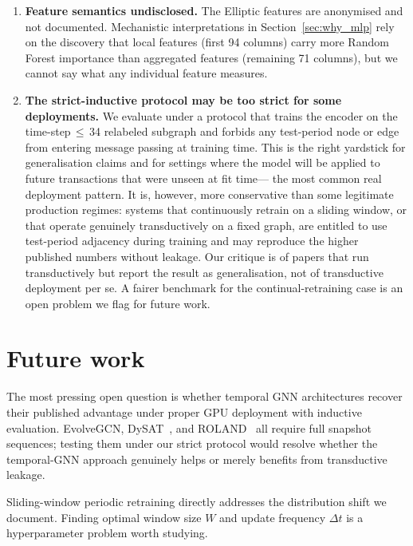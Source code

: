 \begin{enumerate}[leftmargin=*]
  \item \textbf{Feature semantics undisclosed.}  The Elliptic
    features are anonymised and not documented.  Mechanistic
    interpretations in Section~\ref{sec:why_mlp} rely on the
    discovery that local features (first 94 columns) carry more
    Random Forest importance than aggregated features (remaining
    71 columns), but we cannot say what any individual feature
    measures.

  \item \textbf{The strict-inductive protocol may be too strict for
    some deployments.}  We evaluate under a protocol that trains the
    encoder on the time-step\,$\le$\,34 relabeled subgraph and
    forbids any test-period node or edge from entering message
    passing at training time.  This is the right yardstick for
    generalisation claims and for settings where the model will be
    applied to future transactions that were unseen at fit time---
    the most common real deployment pattern.  It is, however, more
    conservative than some legitimate production regimes: systems
    that continuously retrain on a sliding window, or that operate
    genuinely transductively on a fixed graph, are entitled to use
    test-period adjacency during training and may reproduce the
    higher published numbers without leakage.  Our critique is of
    papers that run transductively but report the result as
    generalisation, not of transductive deployment per se.  A
    fairer benchmark for the continual-retraining case is an open
    problem we flag for future work.
\end{enumerate}


\section{Future work}
\label{sec:future}

The most pressing open question is whether temporal GNN architectures
recover their published advantage under proper GPU deployment with
inductive evaluation.  EvolveGCN, DySAT~\citep{sankar2020}, and
ROLAND~\citep{you2022roland} all require full snapshot sequences;
testing them under our strict protocol would resolve whether the
temporal-GNN approach genuinely helps or merely benefits from
transductive leakage.

Sliding-window periodic retraining directly addresses the distribution
shift we document.  Finding optimal window size $W$ and update
frequency $\Delta t$ is a hyperparameter problem worth studying.

